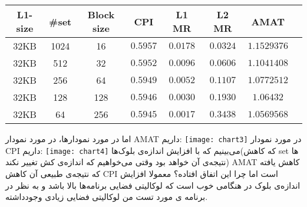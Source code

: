 \documentclass[11pt]{article}
\begin{document}
\begin{latin}
\begin{center}
\begin{tabular}{|c|c|c|c|c|c|c|c|}
\hline
\rowcolor{black!30}
L1-size	& \#set&Block size	&	CPI	 & L1 MR & L2 MR & 	AMAT\\ \hline
32KB	&	1024	&		16		&$0.5957$&$0.0178$&$0.0324$&$1.1529376$\\ \hline
32KB	&	512		&		32		&$0.5952$&$0.0096$&$0.0606$&$1.1041408$\\ \hline
32KB	&	256		&		64		&$0.5949$&$ 0.0052$&$0.1107$&$1.0772512$\\ \hline
32KB	&	128		&		128		&$0.5946$&$0.0030$&$0.1930$&$1.06432$\\ \hline
32KB	&	64		&		256		&$0.5945$&$0.0017$&$0.3438$&$1.0569568$\\ \hline
\end{tabular}
\end{center}
\end{latin}
اما در مورد نمودارها، در مورد نمودار AMAT داریم:\newline
\texttt{[image: chart3]}
در مورد نمودار CPI داریم:
\newline
\texttt{[image: chart4]}
\newline
می‌بینیم که با افزایش اندازه‌ی بلوک‌ها(که کاهش set ها نتیجه‌ی آن خواهد بود وقتی می‌خواهیم که اندازه‌ی کش تغییر نکند) AMAT کاهش یافته که نتیجه‌ی طبیعی آن کاهش CPI است اما چرا این اتفاق افتاده؟ معمولا افزایش اندازه‌ی بلوک در هنگامی خوب است که لوکالیتی فضایی برنامه‌ها بالا باشد و به نظر در برنامه‌ ‌ی مورد تست من لوکالیتی فضایی زیادی وجودداشته.
\end{document}
